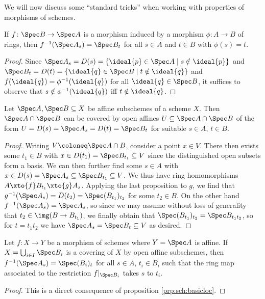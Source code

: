 \documentclass[wip, algebra]{bsteffan-lecturenotes}
\begin{document}
We will now discuss some \enquote{standard tricks} when working with properties of morphisms of schemes.
\begin{proposition}\label{prp:sch:basicloc}
	If $f\colon \Spec B \to \Spec A$ is a morphism induced by a morphism $\phi\colon A \to B$ of rings, then $f^{-1}(\Spec A_s) = \Spec B_t$ for all $s \in A$ and $t \in B$ with $\phi(s) = t$.
\end{proposition}
\begin{proof}
	Since $\Spec A_s = D(s) = \{\ideal{p} \in \Spec A \mid s \notin \ideal{p}\}$ and $\Spec B_t = D(t) = \{\ideal{q} \in \Spec B \mid t \notin \ideal{q}\}$ and $f(\ideal{q}) = \phi^{-1}(\ideal{q})$ for all $\ideal{q} \in \Spec B$, it suffices to observe that $s \notin \phi^{-1}(\ideal{q})$ iff $t \notin \ideal{q}$.
\end{proof}
\begin{proposition}
	Let $\Spec A, \Spec B \subseteq X$ be affine subschemes of a scheme $X$. 
	Then $\Spec A \cap \Spec B$ can be covered by open affines $U \subseteq \Spec A \cap \Spec B$ of the form $U = D(s) = \Spec A_s = D(t) = \Spec B_t$ for suitable $s \in A$, $t \in B$.
\end{proposition}
\begin{proof}
	Writing $V \coloneq \Spec A \cap B$, consider a point $x \in V$.
	There then exists some $t_1 \in B$ with $x \in D(t_1) = \Spec B_{t_1} \subseteq V$ since the distinguished open subsets form a basis.
	We can then further find some $s \in A$ with $x \in D(s) = \Spec A_s \subseteq \Spec B_{t_1} \subseteq V$.
	We thus have ring homomorphisms $A \xto{f} B_{t_1} \xto{g} A_s$.
	Applying the last proposition to $g$, we find that $g^{-1}(\Spec A_s) = D(t_2) = \Spec (B_{t_1})_{t_2}$ for some $t_2 \in B$.
	On the other hand $f^{-1}(\Spec A_s) = \Spec A_s$, so since we may assume without loss of generality that $t_2 \in \img(B \to B_{t_1})$, we finally obtain that $\Spec (B_{t_1})_{t_2} = \Spec B_{t_1 t_2}$, so for $t = t_1 t_2$ we have $\Spec A_s = \Spec B_t \subseteq V$ as desired.
\end{proof}
\begin{proposition}
	Let $f\colon X \to Y$ be a morphism of schemes where $Y = \Spec A$ is affine.
	If $X = \bigcup_{i \in I} \Spec B_i$ is a covering of $X$ by open affine subschemes, then $f^{-1}(\Spec A_s) = \Spec (B_i)_t$ for all $s \in A$, $t_i \in B_i$ such that the ring map associated to the restriction $f|_{\Spec B_i}$ takes $s$ to $t_i$.
\end{proposition}
\begin{proof}
	This is a direct consequence of proposition \ref{prp:sch:basicloc}.
\end{proof}
\end{document}
